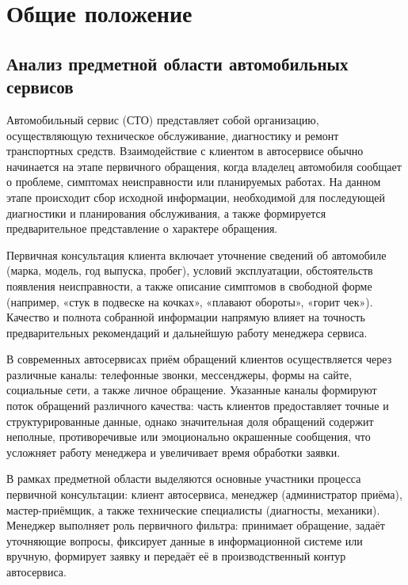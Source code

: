 \documentclass[14pt,a4paper]{extarticle}
\numberwithin{figure}{section}
\numberwithin{table}{section}
\begin{document}

\clearpage
\tableofcontents
\clearpage

\section{Общие
положение}\label{ux43eux431ux449ux438ux435-ux43fux43eux43bux43eux436ux435ux43dux438ux435}

\subsection{Анализ предметной области автомобильных
сервисов}\label{ux430ux43dux430ux43bux438ux437-ux43fux440ux435ux434ux43cux435ux442ux43dux43eux439-ux43eux431ux43bux430ux441ux442ux438-ux430ux432ux442ux43eux43cux43eux431ux438ux43bux44cux43dux44bux445-ux441ux435ux440ux432ux438ux441ux43eux432}

Автомобильный сервис (СТО) представляет собой организацию,
осуществляющую техническое обслуживание, диагностику и ремонт
транспортных средств. Взаимодействие с клиентом в автосервисе обычно
начинается на этапе первичного обращения, когда владелец автомобиля
сообщает о проблеме, симптомах неисправности или планируемых работах. На
данном этапе происходит сбор исходной информации, необходимой для
последующей диагностики и планирования обслуживания, а также формируется
предварительное представление о характере обращения.

Первичная консультация клиента включает уточнение сведений об автомобиле
(марка, модель, год выпуска, пробег), условий эксплуатации,
обстоятельств появления неисправности, а также описание симптомов в
свободной форме (например, «стук в подвеске на кочках», «плавают
обороты», «горит чек»). Качество и полнота собранной информации напрямую
влияет на точность предварительных рекомендаций и дальнейшую работу
менеджера сервиса.

В современных автосервисах приём обращений клиентов осуществляется через
различные каналы: телефонные звонки, мессенджеры, формы на сайте,
социальные сети, а также личное обращение. Указанные каналы формируют
поток обращений различного качества: часть клиентов предоставляет точные
и структурированные данные, однако значительная доля обращений содержит
неполные, противоречивые или эмоционально окрашенные сообщения, что
усложняет работу менеджера и увеличивает время обработки заявки.

В рамках предметной области выделяются основные участники процесса
первичной консультации: клиент автосервиса, менеджер (администратор
приёма), мастер-приёмщик, а также технические специалисты (диагносты,
механики). Менеджер выполняет роль первичного фильтра: принимает
обращение, задаёт уточняющие вопросы, фиксирует данные в информационной
системе или вручную, формирует заявку и передаёт её в производственный
контур автосервиса.
\end{document}
